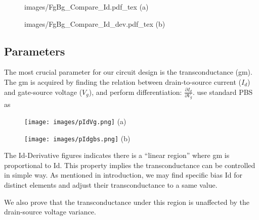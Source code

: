 \begin{figure}[!htbp]
    \centering
    \begin{minipage}[t][0.1\textheight]{1\textwidth}
        \centering
        \def\svgwidth{10cm}
        \fontsize{6}{15}\selectfont
         {images/FgBg_Compare_Id.pdf_tex}
        (a)
    \end{minipage}
    \vfill
    \begin{minipage}[t][0.1\textheight]{1\textwidth}
        \centering
        \def\svgwidth{10cm}
        \fontsize{6}{15}\selectfont
         {images/FgBg_Compare_Id_dev.pdf_tex}
        (b)
    \end{minipage}
    \caption{}
    \label{fig:IdVgandgbsId}
\end{figure}

\subsection{Parameters}
The most crucial parameter for our circuit design is the transconductance (gm).
{\color{red}
    The gm is acquired by finding the relation between drain-to-source current ($I_d$) and gate-source voltage ($V_g$), and perform differentiation: $\frac{\partial I_d}{\partial V_g}$.
    use standard PBS as
}

\begin{figure}[!htbp]
    \centering
    \begin{minipage}[t][0.1\textheight]{1\textwidth}
        \centering
        \texttt{[image: images/pIdVg.png]}
        (a)
    \end{minipage}
    \hfill
    \begin{minipage}[t][0.1\textheight]{1\textwidth}
        \centering
        \texttt{[image: images/pIdgbs.png]}
        (b)
    \end{minipage}
    \caption{}
    \label{fig:res}
\end{figure}

The Id-Derivative figures indicates there is a ``linear region'' where gm is proportional to Id.
This property implies the transconductance can be controlled in simple way.
As mentioned in introduction, we may find specific bias Id for distinct elements and adjust their transconductance to a same value.



We also prove that the transconductance under this region is unaffected by the drain-source voltage variance.

